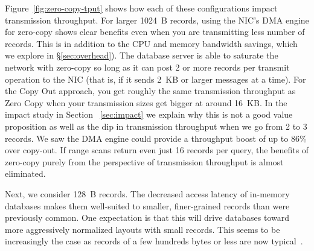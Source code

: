 
Figure~\ref{fig:zero-copy-tput} shows how each of these configurations impact
transmission throughput. For larger 1024~B records, using the NIC's DMA engine
for zero-copy shows clear benefits even when you are transmitting less number of 
records. This is in addition to the CPU and memory bandwidth savings, which 
we explore in \S\ref{sec:overhead}). The database server is able
to saturate the network with zero-copy so long as it can post 2 or more
records per transmit operation to the NIC (that is, if it sends 2~KB or larger
messages at a time). For the Copy Out approach, you get roughly the same transmission 
throughput as Zero Copy when your transmission sizes get bigger at around 16~KB. In 
the impact study in Section ~\ref{sec:impact} we explain why this is not a good value 
proposition as well as the dip in transmission throughput when we go from 2 to 3 records.
We saw the DMA engine could provide a throughput boost
of up to 86\% over copy-out. If range scans return even just 16 records per query, the
benefits of zero-copy purely from the perspective of transmission throughput is almost eliminated.

Next, we consider 128~B records. The decreased access latency of
in-memory databases makes them well-suited to smaller, finer-grained records
than were previously common. One expectation is that this will drive databases
toward more aggressively normalized layouts with small records. This
seems to be increasingly the case as records of a few hundreds bytes or less
are now typical~\cite{fb-memcache,fb-workload}.

